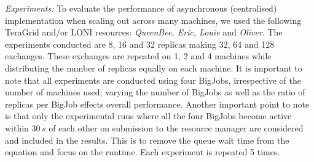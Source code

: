 \documentclass{rspublic}
\newcommand{\alnote}[1]{ {\textcolor{blue} { ***andre: #1 }}}
\newcommand{\alnote}[1]{}
\begin{document}
{\it Experiments:} To evaluate the performance of asynchronous
(centralised) implementation when scaling out across many machines, we
used the following TeraGrid and/or LONI resources: \emph{QueenBee,
  Eric, Louie} and \emph{Oliver}. The experiments conducted are 8, 16
and 32 replicas making 32, 64 and 128 exchanges. These exchanges are
repeated on 1, 2 and 4 machines while distributing the number of
replicas equally on each machine. It is important to note that all
experiments are conducted using four BigJobs, irrespective of the
number of machines used; varying the number of BigJobs as well as the
ratio of replicas per BigJob effects overall performance.  Another
important point to note is that only the experimental runs where all
the four BigJobs become active within $30\,s$ of each other on
submission to the resource manager are considered and included in the
results. This is to remove the queue wait time from the equation and
focus on the runtime. Each experiment is repeated 5 times.





\end{document}
